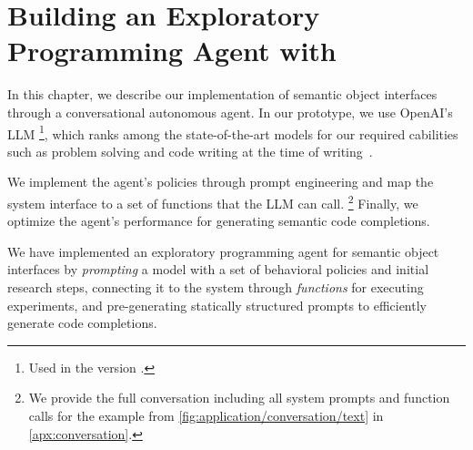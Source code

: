 
\chapter{Building an Exploratory Programming Agent with \gptfouro}
\label{cha:agent}

In this chapter, we describe our implementation of semantic object interfaces through a conversational autonomous agent.
In our prototype, we use OpenAI's LLM \gptfouro\footnote{Used in the version .}, which ranks among the state-of-the-art models for our required cabilities such as problem solving and code writing at the time of writing~\cite{openai2024gpt4}.

We implement the agent's policies through prompt engineering and map the system interface to a set of functions that the LLM can call.%
\footnote{We provide the full conversation including all system prompts and function calls for the example from \cref{fig:application/conversation/text} in \cref{apx:conversation}.} %
Finally, we optimize the agent's performance for generating semantic code completions.


\begin{summary}
	We have implemented an exploratory programming agent for semantic object interfaces by \emph{prompting} a \gptfouro model with a set of behavioral policies and initial research steps, connecting it to the system through \emph{functions} for executing experiments, and pre-generating statically structured prompts to efficiently generate code completions.
\end{summary}
